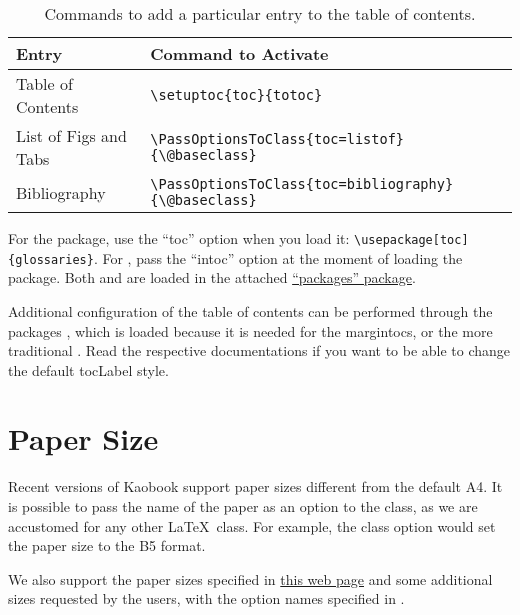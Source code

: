 \begin{table}
\footnotesize
\caption{Commands to add a particular entry to the table of contents.}
\begin{tabular}{ l l }
	\toprule
	Entry & Command to Activate \\
	\midrule
	Table of Contents & \lstinline|\setuptoc{toc}{totoc}| \\
	List of Figs and Tabs & \lstinline|\PassOptionsToClass{toc=listof}{\@baseclass}| \\
	Bibliography & \lstinline|\PassOptionsToClass{toc=bibliography}{\@baseclass}| \\
	\bottomrule
\end{tabular}
\end{table}

For the  package, use the \enquote{toc} option when 
you load it: \lstinline|\usepackage[toc]{glossaries}|. For 
, pass the \enquote{intoc} option at the moment of 
loading the package. Both  and  are 
loaded in the attached \href{style/packages.sty}{\enquote{packages} 
package}.

Additional configuration of the table of contents can be performed 
through the packages , which is loaded because it is 
needed for the margintocs, or the more traditional . 
Read the respective documentations if you want to be able to change the 
default \acrshort{tocLabel} style.

\section{Paper Size}

Recent versions of Kaobook support paper sizes different from the
default A4. It is possible to pass the name of the paper as an option
to the class, as we are accustomed for any other \LaTeX\ class. For
example, the class option  would set the paper size
to the B5 format.

We also support the paper sizes specified in
\href{https://www.bod.de/hilfe/hilfe-und-service.html?cmd=SINGLE\&entryID=2494\_GER\_WSS\&eo=2\&title=welche-buchformate-gibt-es}{this
web page} and some additional sizes requested by the users, with the 
option names specified in .

